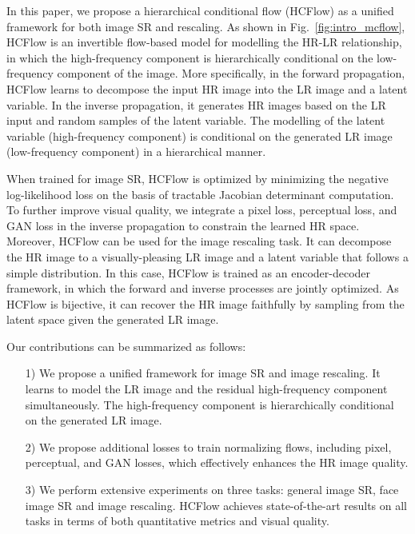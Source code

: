 \documentclass[10pt,twocolumn,letterpaper]{article}
\begin{document}
In this paper, we propose a hierarchical conditional flow (HCFlow) as a unified framework for both image SR and rescaling. As shown in Fig.~\ref{fig:intro_mcflow}, HCFlow is an invertible flow-based model for modelling the HR-LR relationship, in which the high-frequency component is hierarchically conditional on the low-frequency component of the image. More specifically, in the forward propagation, HCFlow learns to decompose the input HR image into the LR image and a latent variable. In the inverse propagation, it generates HR images based on the LR input and random samples of the latent variable. The modelling of the latent variable (high-frequency component) is conditional on the generated LR image (low-frequency component) in a hierarchical manner.

When trained for image SR, HCFlow is optimized by minimizing the negative log-likelihood loss on the basis of tractable Jacobian determinant computation. To further improve visual quality, we integrate a pixel loss, perceptual loss, and GAN loss in the inverse propagation to constrain the learned HR space. Moreover, HCFlow can be used for the image rescaling task. It can decompose the HR image to a visually-pleasing LR image and a latent variable that follows a simple distribution. In this case, HCFlow is trained as an encoder-decoder framework, in which the forward and inverse processes are jointly optimized. As HCFlow is bijective, it can recover the HR image faithfully by sampling from the latent space given the generated LR image.

Our contributions can be summarized as follows:
\begin{itemize}
  \vspace{-0.2cm}
  \item[1)] We propose a unified framework for image SR and image rescaling. It learns to model the LR image and the residual high-frequency component simultaneously. The high-frequency component is hierarchically conditional on the generated LR image.
  \vspace{-0.2cm}
  \item[2)] We propose additional losses to train normalizing flows, including pixel, perceptual, and GAN losses, which effectively enhances the HR image quality. 
  \vspace{-0.2cm}
  \item[3)] We perform extensive experiments on three tasks: general image SR, face image SR and image rescaling. HCFlow achieves state-of-the-art results on all tasks in terms of both quantitative metrics and visual quality.
\end{itemize}
\end{document}
